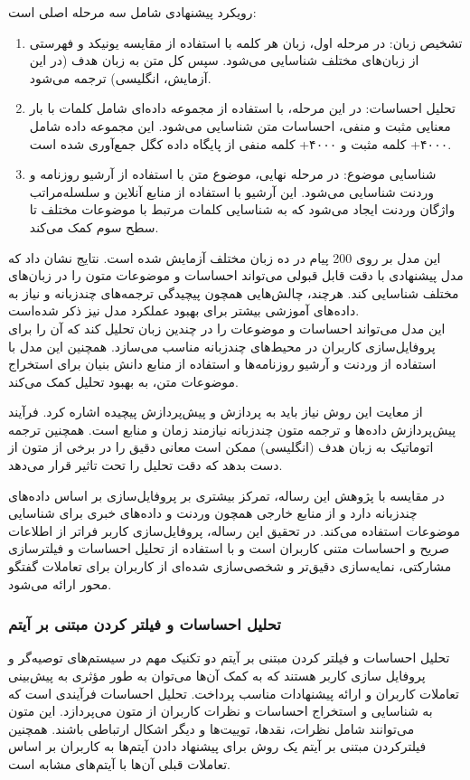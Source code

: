 رویکرد پیشنهادی شامل سه مرحله اصلی است:
\begin{enumerate}
\item
تشخیص زبان: در مرحله اول، زبان هر کلمه با استفاده از مقایسه 
یونیکد%
 و فهرستی از زبان‌های مختلف شناسایی می‌شود. سپس کل متن به زبان هدف (در این آزمایش، انگلیسی) ترجمه می‌شود.
\item
تحلیل احساسات: در این مرحله، با استفاده از مجموعه داده‌ای شامل کلمات با بار معنایی مثبت و منفی، احساسات متن شناسایی می‌شود. این مجموعه داده شامل ۴۰۰۰+ کلمه مثبت و ۴۰۰۰+ کلمه منفی از پایگاه داده 
کگل%
جمع‌آوری شده است.
\item
شناسایی موضوع: در مرحله نهایی، موضوع متن با استفاده از آرشیو روزنامه و وردنت شناسایی می‌شود. این آرشیو با استفاده از منابع آنلاین و سلسله‌مراتب واژگان وردنت ایجاد می‌شود که به شناسایی کلمات مرتبط با موضوعات مختلف تا سطح سوم کمک می‌کند.
\end{enumerate}
این مدل بر روی 200 پیام در ده زبان مختلف آزمایش شده است.
نتایج نشان داد که مدل پیشنهادی با دقت قابل قبولی می‌تواند احساسات و موضوعات متون را در زبان‌های مختلف شناسایی کند. هرچند، چالش‌هایی همچون پیچیدگی ترجمه‌های چندزبانه و نیاز به داده‌های آموزشی بیشتر برای بهبود عملکرد مدل نیز ذکر شده‌است.\\

این مدل می‌تواند احساسات و موضوعات را در چندین زبان تحلیل کند که آن را برای پروفایل‌سازی کاربران در محیط‌های چندزبانه مناسب می‌سازد.
همچنین این مدل با استفاده از وردنت و آرشیو روزنامه‌ها و استفاده از منابع دانش بنیان برای استخراج موضوعات متن، به بهبود تحلیل کمک می‌کند.

از معایت این روش نیاز باید به پردازش و پیش‌پردازش پیچیده اشاره کرد. فرآیند پیش‌پردازش داده‌ها و ترجمه متون چندزبانه نیازمند زمان و منابع است. همچنین ترجمه اتوماتیک به زبان هدف (انگلیسی) ممکن است معانی دقیق را در برخی از متون از دست بدهد که دقت تحلیل را تحت تاثیر قرار می‌دهد.

در مقایسه با پژوهش این رساله،
\cite{nag2023knowledge}
 تمرکز بیشتری بر پروفایل‌سازی بر اساس داده‌های چندزبانه دارد و از منابع خارجی همچون وردنت و داده‌های خبری برای شناسایی موضوعات استفاده می‌کند. در تحقیق این رساله، پروفایل‌سازی کاربر فراتر از اطلاعات صریح و احساسات متنی کاربران است و با استفاده از تحلیل احساسات و فیلترسازی مشارکتی، نمایه‌سازی دقیق‌تر و شخصی‌سازی شده‌ای از کاربران برای تعاملات گفتگو محور ارائه می‌شود.



\subsubsection{تحلیل احساسات و فیلتر کردن مبتنی بر آیتم}
تحلیل احساسات و فیلتر کردن مبتنی بر آیتم دو تکنیک مهم در سیستم‌های توصیه‌گر و پروفایل سازی کاربر هستند که به کمک آن‌ها می‌توان به طور مؤثری به پیش‌بینی تعاملات کاربران و ارائه پیشنهادات مناسب پرداخت. 
تحلیل احساسات فرآیندی است که به شناسایی و استخراج احساسات و نظرات کاربران از متون می‌پردازد. این متون می‌توانند شامل نظرات، نقدها، توییت‌ها و دیگر اشکال ارتباطی باشند. همچنین فیلترکردن مبتنی بر آیتم یک روش برای پیشنهاد دادن آیتم‌ها به کاربران بر اساس تعاملات قبلی آن‌ها با آیتم‌های مشابه است.



